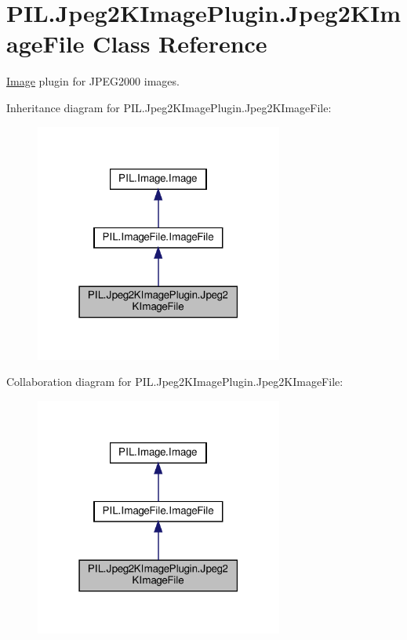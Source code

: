 \hypertarget{classPIL_1_1Jpeg2KImagePlugin_1_1Jpeg2KImageFile}{}\section{P\+I\+L.\+Jpeg2\+K\+Image\+Plugin.\+Jpeg2\+K\+Image\+File Class Reference}
\label{classPIL_1_1Jpeg2KImagePlugin_1_1Jpeg2KImageFile}


\hyperlink{namespacePIL_1_1Image}{Image} plugin for J\+P\+E\+G2000 images.  




Inheritance diagram for P\+I\+L.\+Jpeg2\+K\+Image\+Plugin.\+Jpeg2\+K\+Image\+File\+:
\nopagebreak
\begin{figure}[H]
\begin{center}
\leavevmode
\includegraphics[width=231pt]{classPIL_1_1Jpeg2KImagePlugin_1_1Jpeg2KImageFile__inherit__graph}
\end{center}
\end{figure}


Collaboration diagram for P\+I\+L.\+Jpeg2\+K\+Image\+Plugin.\+Jpeg2\+K\+Image\+File\+:
\nopagebreak
\begin{figure}[H]
\begin{center}
\leavevmode
\includegraphics[width=231pt]{classPIL_1_1Jpeg2KImagePlugin_1_1Jpeg2KImageFile__coll__graph}
\end{center}
\end{figure}
